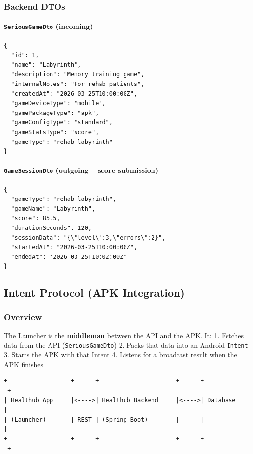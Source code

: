 \subsubsection{Backend DTOs}\label{backend-dtos}

\paragraph{\texttt{SeriousGameDto} (incoming)}\label{seriousgamedto-incoming}

\begin{lstlisting}
{
  "id": 1,
  "name": "Labyrinth",
  "description": "Memory training game",
  "internalNotes": "For rehab patients",
  "createdAt": "2026-03-25T10:00:00Z",
  "gameDeviceType": "mobile",
  "gamePackageType": "apk",
  "gameConfigType": "standard",
  "gameStatsType": "score",
  "gameType": "rehab_labyrinth"
}
\end{lstlisting}

\paragraph{\texttt{GameSessionDto} (outgoing -- score submission)}\label{gamesessiondto-outgoing-score-submission}

\begin{lstlisting}
{
  "gameType": "rehab_labyrinth",
  "gameName": "Labyrinth",
  "score": 85.5,
  "durationSeconds": 120,
  "sessionData": "{\"level\":3,\"errors\":2}",
  "startedAt": "2026-03-25T10:00:00Z",
  "endedAt": "2026-03-25T10:02:00Z"
}
\end{lstlisting}

\subsection{Intent Protocol (APK
Integration)}\label{intent-protocol-apk-integration}

\subsubsection{Overview}\label{overview-1}

The Launcher is the \textbf{middleman} between the API and the APK. It:
1. Fetches data from the API (\texttt{SeriousGameDto}) 2. Packs that
data into an Android \texttt{Intent} 3. Starts the APK with that Intent
4. Listens for a broadcast result when the APK finishes

\begin{verbatim}
+------------------+      +----------------------+      +--------------+
| Healthub App     |<---->| Healthub Backend     |<---->| Database     |
| (Launcher)       | REST | (Spring Boot)        |      |              |
+------------------+      +----------------------+      +--------------+
\end{verbatim}

